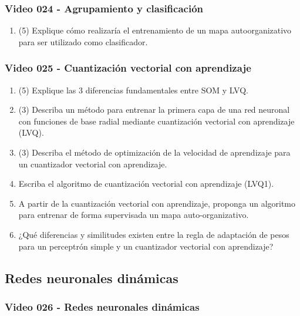 \documentclass[a4paper,10pt,spanish,oneside]{article}
\begin{document}
\subsubsection{Video 024 - Agrupamiento y clasificación}

\begin{enumerate}
\item (5) Explique cómo realizaría el entrenamiento de un mapa autoorganizativo para ser utilizado como clasificador.
\end{enumerate}

\subsubsection{Video 025 - Cuantización vectorial con aprendizaje}

\begin{enumerate}
\item (5) Explique las 3 diferencias fundamentales entre SOM y LVQ.

\item (3) Describa un método para entrenar la primera capa de una red neuronal con funciones de base radial mediante cuantización vectorial con aprendizaje (LVQ).

\item (3) Describa el método de optimización de la velocidad de aprendizaje para un cuantizador vectorial con aprendizaje.

\item Escriba el algoritmo de cuantización vectorial con aprendizaje (LVQ1).

\item A partir de la cuantización vectorial con aprendizaje, proponga un algoritmo para entrenar de forma supervisada un mapa auto-organizativo.

\item ¿Qué diferencias y similitudes existen entre la regla de adaptación de pesos para un perceptrón simple y un cuantizador vectorial con aprendizaje?
\end{enumerate}

\newpage

\subsection{Redes neuronales dinámicas}

\subsubsection{Video 026 - Redes neuronales dinámicas}
\end{document}
